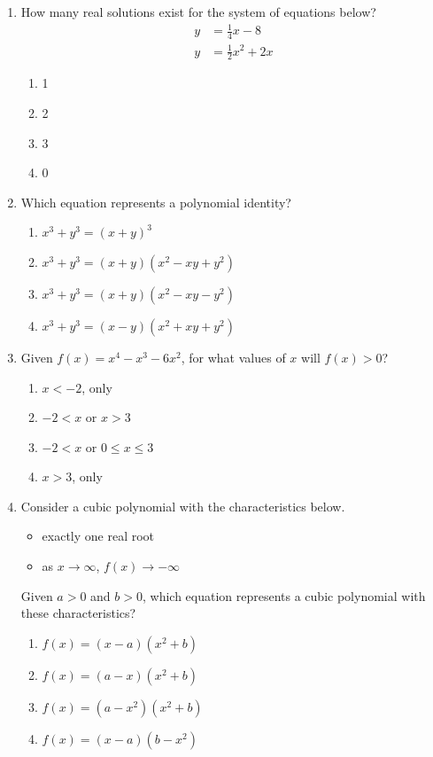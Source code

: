 \documentclass[12pt, twoside]{article}
\begin{document}
\begin{enumerate}[itemsep=0.5cm]
\item How many real solutions exist for the system of equations below?
\begin{align*}
    y &= \frac{1}{4} x - 8 \\
    y &= \frac{1}{2} x^2 + 2x
\end{align*}
\begin{enumerate}
    \item 1
    \item 2
    \item 3
    \item 0
\end{enumerate}

\item Which equation represents a polynomial identity?
\begin{enumerate}
    \item \(x^3 + y^3 = (x + y)^3\)
    \item \(x^3 + y^3 = (x + y)(x^2 - xy + y^2)\)
    \item \(x^3 + y^3 = (x + y)(x^2 - xy - y^2)\)
    \item \(x^3 + y^3 = (x - y)(x^2 + xy + y^2)\)
\end{enumerate}

\item Given $f(x) = x^4 - x^3 - 6x^2$, for what values of $x$ will $f(x)>0$?
\begin{enumerate}
    \item $x<-2$, only
    \item $-2<x$ or $x>3$
    \item $-2<x$ or $0 \le x \le 3$
    \item $x>3$, only
\end{enumerate}

\item  Consider a cubic polynomial with the characteristics below.
\begin{itemize}
\item exactly one real root
\item as $x \rightarrow \infty$, $f(x) \rightarrow -\infty$
\end{itemize}
Given $a>0$ and $b>0$, which equation represents a cubic
polynomial with these characteristics?
\begin{enumerate}
    \item $f(x) = (x - a)(x^2 + b)$
    \item $f(x) = (a - x)(x^2 + b)$
    \item $f(x) = (a - x^2)(x^2 + b)$
    \item $f(x) = (x - a)(b - x^2)$
\end{enumerate}


\end{enumerate}
\end{document}
